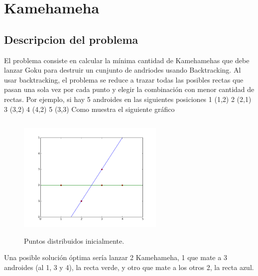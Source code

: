 \documentclass[10pt,a4paper]{article}
\begin{document}

\section{Kamehameha}

\subsection{Descripcion del problema}

El problema consiste en calcular la mínima cantidad de Kamehamehas que debe lanzar Goku para destruir un cunjunto de andriodes usando Backtracking.
Al usar backtracking, el problema se reduce a trazar todas las posibles rectas que pasan una sola vez por cada punto y elegir la combinación con menor cantidad de rectas. Por ejemplo, si hay 5 androides en las siguientes posiciones
1 (1,2) 2 (2,1) 3 (3,2) 4 (4,2) 5 (3,3)
Como muestra el siguiente gráfico
\begin{figure}[h!]
  \centering
  \includegraphics[width=7cm, height=6cm]{ejemploHame1}
  \caption{Puntos distribuidos inicialmente.}
\end{figure}

Una posible solución óptima sería lanzar 2 Kamehameha, 1 que mate a 3 androides (al 1, 3 y 4), la recta verde, y otro que mate a los otros 2, la recta azul.
\end{document}
